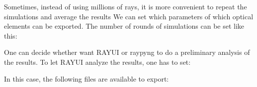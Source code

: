 \documentclass[letterpaper,10pt,english]{sphinxmanual}
\begin{document}
\sphinxAtStartPar
Sometimes, instead of using millions of rays, it is more convenient to repeat the simulations and average the results
We can set which parameters of which optical elements can be exported. The number of rounds of simulations can be set like this:

\begin{sphinxVerbatim}[commandchars=\\\{\}]
  
\end{sphinxVerbatim}

\sphinxAtStartPar
One can decide whether want RAY\sphinxhyphen{}UI or raypyng to do a preliminary analysis of the results.
To let RAY\sphinxhyphen{}UI analyze the results, one has to set:

\begin{sphinxVerbatim}[commandchars=\\\{\}]
   
\end{sphinxVerbatim}

\sphinxAtStartPar
In this case, the following files are available to export:
\end{document}
